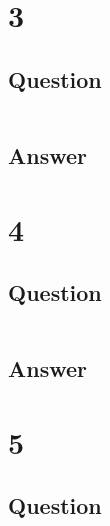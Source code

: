 \documentclass[letterpaper,11pt]{article}
\begin{document}
\section*{3}

\subsection*{Question}

\begin{verbatim}

\end{verbatim}

\subsection*{Answer}



\clearpage


\section*{4}

\subsection*{Question}

\begin{verbatim}

\end{verbatim}

\subsection*{Answer}


\clearpage


\section*{5}

\subsection*{Question}

\begin{verbatim}

\end{verbatim}
\end{document}
